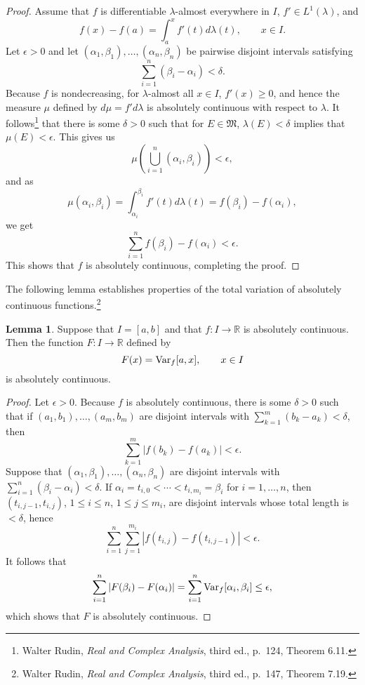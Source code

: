 \documentclass{article}
\newcommand{\Var}{\ensuremath\mathrm{Var}}
\theoremstyle{definition}
\newtheorem{lemma}[theorem]{Lemma}
\theoremstyle{definition}
\begin{document}
\begin{proof}
Assume that $f$ is differentiable $\lambda$-almost everywhere in $I$, $f' \in L^1(\lambda)$, and
\[
f(x)-f(a) = \int_a^x f'(t) d\lambda(t), \qquad x \in I.
\]
Let $\epsilon>0$ and let $(\alpha_1,\beta_1),\ldots,(\alpha_n,\beta_n)$ be pairwise disjoint intervals satisfying
\[
\sum_{i=1}^n (\beta_i-\alpha_i)<\delta.
\]
Because $f$ is nondecreasing, for $\lambda$-almost all $x \in I$, $f'(x) \geq 0$, and hence
the measure $\mu$ defined by $d\mu = f' d\lambda$ is absolutely continuous with respect to $\lambda$.
It follows\footnote{Walter Rudin, {\em Real and Complex Analysis}, third ed., p.~124, Theorem 6.11.}
that there is some $\delta>0$ such that for $E \in \mathfrak{M}$,
$\lambda(E)<\delta$ implies that $\mu(E)<\epsilon$. This gives us
\[
\mu\left(\bigcup_{i=1}^n (\alpha_i,\beta_i) \right)
<\epsilon,
\]
and as
\[
\mu(\alpha_i,\beta_i)=\int_{\alpha_i}^{\beta_i} f'(t) d\lambda(t)
=f(\beta_i)-f(\alpha_i),
\]
we get
\[
\sum_{i=1}^n f(\beta_i)-f(\alpha_i)<\epsilon.
\]
This shows that $f$ is absolutely continuous, completing the proof.
\end{proof}


The following lemma establishes properties of the total variation of absolutely continuous functions.\footnote{Walter Rudin,
{\em Real and Complex Analysis}, third ed., p.~147, Theorem 7.19.}

\begin{lemma}
Suppose that $I=[a,b]$ and that $f:I \to \mathbb{R}$ is absolutely continuous. Then the function $F:I \to \mathbb{R}$ defined
by
\[
F(x)=\Var_f[a,x], \qquad x \in I
\]
is absolutely continuous.
\label{Fvariation}
\end{lemma}
\begin{proof}
Let $\epsilon>0$. Because $f$ is absolutely continuous,
there is some $\delta>0$ such that if
 $(a_1,b_1),\ldots,(a_m,b_m)$ are disjoint intervals
with $\sum_{k=1}^m (b_k-a_k)<\delta$, then
\[
\sum_{k=1}^m |f(b_k)-f(a_k)|<\epsilon.
\]
Suppose that $(\alpha_1,\beta_1),\ldots,(\alpha_n,\beta_n)$ are disjoint intervals with
$\sum_{i=1}^n (\beta_i-\alpha_i)<\delta$. If
 $\alpha_i=t_{i,0}<\cdots<t_{i,m_i}=\beta_i$ for $i=1,\ldots,n$, then
 $(t_{i,j-1},t_{i,j})$, $1 \leq i \leq n$, $1 \leq j \leq m_i$, are disjoint intervals
whose total length is $<\delta$, hence 
\[
\sum_{i=1}^n \sum_{j=1}^{m_i} |f(t_{i,j})-f(t_{i,j-1})|<\epsilon.
\]
It follows that
\[
\sum_{i=1}^n |F(\beta_i)-F(\alpha_i)|
=\sum_{i=1}^n \Var_f[\alpha_i,\beta_i]
\leq \epsilon,
\]
which shows that $F$ is absolutely continuous.
\end{proof}
\end{document}
